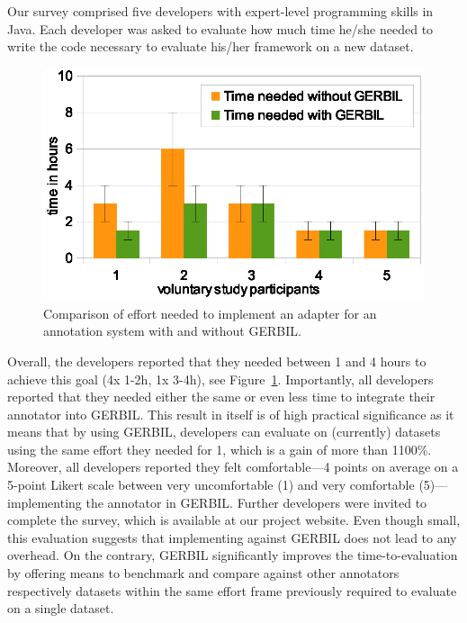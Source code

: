 Our survey comprised five developers with expert-level programming skills in Java. Each developer was asked to evaluate how much time he/she needed to write the code necessary to evaluate his/her framework on a new dataset.

\begin{figure}[htb!]
\centering
\includegraphics[scale=1]{part_02/benchmarking/WWW_GERBIL/user_study.eps}
\caption{Comparison of effort needed to implement an adapter for an annotation system with and without GERBIL.}
\label{ref:comparedTime}
\end{figure}
%

Overall, the developers reported that they needed between 1 and 4 hours to achieve this goal (4x 1-2h, 1x 3-4h), see Figure~\ref{ref:comparedTime}.
Importantly, all developers reported that they needed either the same or even less time to integrate their annotator into GERBIL.
This result in itself is of high practical significance as it means that by using GERBIL, developers can evaluate on (currently) \overalldatasets datasets using the same effort they needed for 1, which is a gain of more than 1100\%.
Moreover, all developers reported they felt comfortable---4 points on average on a 5-point Likert scale between very uncomfortable (1) and very comfortable (5)---implementing the annotator in GERBIL.
Further developers were invited to complete the survey, which is available at our project website.
Even though small, this evaluation suggests that implementing against GERBIL does not lead to any overhead. On the contrary, GERBIL significantly improves the time-to-evaluation by offering means to benchmark and compare against other annotators respectively datasets within the same effort frame previously required to evaluate on a single dataset.

